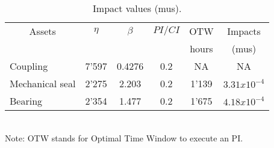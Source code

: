 \begin{table}[h]
	\caption{Impact values (mus).}
	\label{ch05_tbl_ois}
	{\footnotesize
\begin{tabular}{c|c|c|c|c|c}
	\hline
	Assets & $\eta$ & $\beta$ & $PI/CI$ & OTW & Impacts \\ 
	&  &  &  & hours & (mus) \\ 
	\hline
	\multicolumn{1}{l|}{Coupling} & 7'597 & 0.4276 & 0.2 & NA & NA \\ 
	\multicolumn{1}{l|}{Mechanical seal} & 2'275 & 2.203 & 0.2 & 1'139 & $3.31x10^{-4}$ \\ 
	\multicolumn{1}{l|}{Bearing} & 2'354 & 1.477 & 0.2 & 1'675 & $4.18x10^{-4}$ \\ 
	\hline
\end{tabular}
\\
		Note: OTW stands for Optimal Time Window to execute an PI.
	}
\end{table}